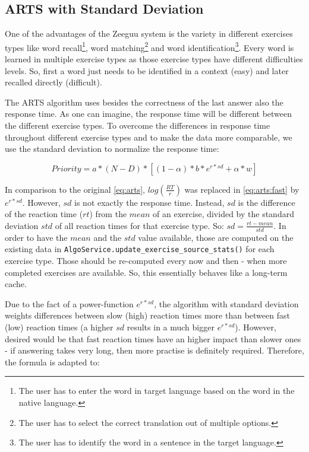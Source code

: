 \documentclass{article}
\begin{document}
\subsection{ARTS with Standard Deviation}\label{arts:sd}
One of the advantages of the Zeeguu system is the variety in different exercises types like word recall\footnote{The user has to enter the word in target language based on the word in the native language.}, word matching\footnote{The user has to select the correct translation out of multiple options.} and word identification\footnote{The user has to identify the word in a sentence in the target language.}. Every word is learned in multiple exercise types as those exercise types have different difficulties levels. So, first a word just needs to be identified in a context (easy) and later recalled directly (difficult).

The ARTS algorithm uses besides the correctness of the last answer also the response time. As one can imagine, the response time will be different between the different exercise types. To overcome the differences in response time throughout different exercise types and to make the data more comparable, we use the standard deviation to normalize the response time:

\begin{equation}\label{eq:arts:fast}
Priority = a * (N-D) * [(1 - \alpha) * b * e^{r * sd} + \alpha * w]
\end{equation}

In comparison to the original \autoref{eq:arts}, $log(\frac{RT}{r})$ was replaced in \autoref{eq:arts:fast} by $e^{r * sd}$. However, $sd$ is not exactly the response time. Instead, $sd$ is the difference of the reaction time ($rt$) from the $mean$ of an exercise, divided by the standard deviation $std$ of all reaction times for that exercise type. So: $sd = \frac{rt - mean}{std}$. In order to have the $mean$ and the $std$ value available, those are computed on the existing data in \lstinline|AlgoService.update_exercise_source_stats()| for each exercise type. Those should be re-computed every now and then - when more completed exercises are available. So, this essentially behaves like a long-term cache.

Due to the fact of a power-function $e^{r * sd}$, the algorithm with standard deviation weights differences between slow (high) reaction times more than between fast (low) reaction times (a higher $sd$ results in a much bigger $e^{r * sd}$). However, desired would be that fast reaction times have an higher impact than slower ones - if answering takes very long, then more practise is definitely required. Therefore, the formula is adapted to: 
\end{document}
